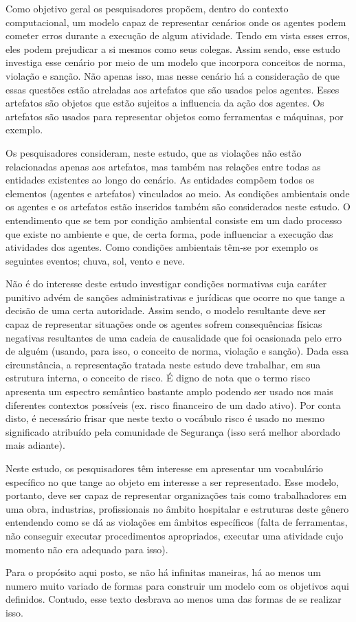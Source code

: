 Como objetivo geral os pesquisadores propõem, dentro do contexto computacional, um modelo capaz de representar cenários onde os agentes podem cometer erros durante a execução de algum atividade. Tendo em vista esses erros, eles podem prejudicar a si mesmos como seus colegas. Assim sendo, esse estudo investiga esse cenário por meio de um modelo que incorpora conceitos de norma, violação e sanção. Não apenas isso, mas nesse cenário há a consideração de que essas questões estão atreladas aos artefatos que são usados pelos agentes. Esses artefatos são objetos que estão sujeitos a influencia da ação dos agentes. Os artefatos são usados para representar objetos como ferramentas e máquinas, por exemplo. 

Os pesquisadores consideram, neste estudo, que as violações não estão relacionadas apenas aos artefatos, mas também nas relações entre todas as entidades existentes ao longo do cenário. As entidades compõem todos os elementos (agentes e artefatos) vinculados ao meio. As condições ambientais onde os agentes e os artefatos estão inseridos também são considerados neste estudo. O entendimento que se tem por condição ambiental consiste em um dado processo que existe no ambiente e que, de certa forma, pode influenciar a execução das atividades dos agentes. Como condições ambientais têm-se por exemplo os seguintes eventos; chuva, sol, vento e neve. 

Não é do interesse deste estudo investigar condições normativas cuja caráter punitivo advém de sanções administrativas e jurídicas que ocorre no que tange a decisão de uma certa autoridade. Assim sendo, o modelo resultante deve ser capaz de representar situações onde os agentes sofrem consequências físicas negativas resultantes de uma cadeia de causalidade que foi ocasionada pelo erro de alguém (usando, para isso, o conceito de norma, violação e sanção). Dada essa circunstância, a representação tratada neste estudo deve trabalhar, em sua estrutura interna, o conceito de risco. É digno de nota que o termo risco apresenta um espectro semântico bastante amplo podendo ser usado nos mais diferentes contextos possíveis (ex. risco financeiro de um dado ativo). Por conta disto, é necessário frisar que neste texto o vocábulo risco é usado no mesmo significado atribuído pela comunidade de Segurança (isso será melhor abordado mais adiante). 

Neste estudo, os pesquisadores têm interesse em apresentar um vocabulário específico no que tange ao objeto em interesse a ser representado. Esse modelo, portanto, deve ser capaz de representar organizações tais como trabalhadores em uma obra, industrias, profissionais no âmbito hospitalar e estruturas deste gênero entendendo como se dá as violações em âmbitos específicos (falta de ferramentas, não conseguir executar procedimentos apropriados, executar uma atividade cujo momento não era adequado para isso). 

Para o propósito aqui posto, se não há infinitas maneiras, há ao menos um numero muito variado de formas para construir um modelo com os objetivos aqui definidos. Contudo, esse texto desbrava ao menos uma das formas de se realizar isso.